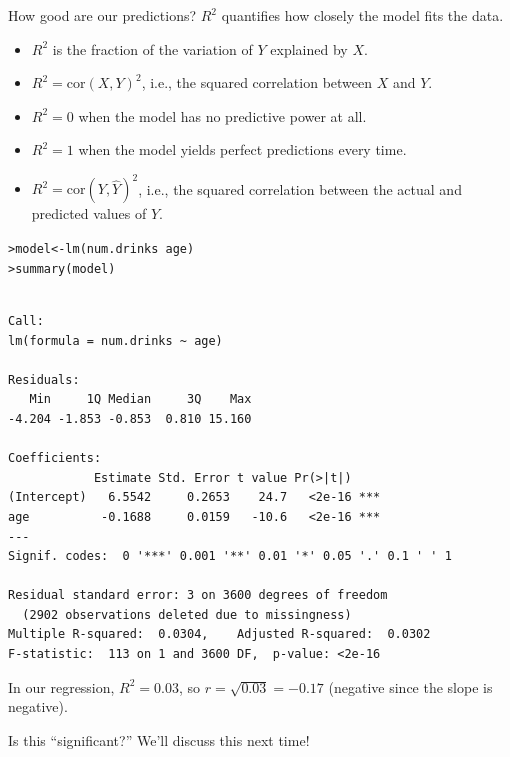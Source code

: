 \documentclass{beamer}\usepackage[]{graphicx}\usepackage[]{color}
\makeatletter
\newcommand{\hlopt}[1]{\textcolor[rgb]{1,0.894,0.769}{#1}}%
\newcommand{\hlstd}[1]{\textcolor[rgb]{1,0.894,0.769}{#1}}%
\newcommand{\hlkwb}[1]{\textcolor[rgb]{0.804,0.776,0.451}{#1}}%
\newcommand{\hlkwd}[1]{\textcolor[rgb]{1,0.78,0.769}{#1}}%
\newenvironment{kframe}{%
 \def\at@end@of@kframe{}%
 \ifinner\ifhmode%
  \def\at@end@of@kframe{\end{minipage}}%
  \begin{minipage}{\columnwidth}%
 \fi\fi%
 \def\FrameCommand##1{\hskip\@totalleftmargin \hskip-\fboxsep
 \colorbox{shadecolor}{##1}\hskip-\fboxsep
     \hskip-\linewidth \hskip-\@totalleftmargin \hskip\columnwidth}%
 \MakeFramed {\advance\hsize-\width
   \@totalleftmargin\z@ \linewidth\hsize
   \@setminipage}}%
 {\par\unskip\endMakeFramed%
 \at@end@of@kframe}
\newenvironment{knitrout}{}{} %
\makeatother
\begin{document}
\begin{darkframes}
    \begin{frame}{How good are our predictions?}
      $R^2$ quantifies how closely the model fits the data.
      \begin{itemize}[<+->]
        \item $R^2$ is the fraction of the variation of $Y$ explained by $X$.
        \item $R^2=\text{cor}(X,Y)^2$, i.e., the squared correlation between $X$ and $Y$.
        \item $R^2=0$ when the model has no predictive power at all.
        \item $R^2=1$ when the model yields perfect predictions every time.
        \item $R^2=\text{cor}(Y,\hat Y)^2$, i.e., the squared correlation between the actual and predicted values of $Y$.
      \end{itemize}
    \end{frame}

    \begin{frame}[fragile]
      \fontsize{9}{9}\selectfont
\begin{knitrout}
\begin{kframe}
\begin{alltt}
\hlstd{> }\hlstd{model} \hlkwb{<-} \hlkwd{lm}\hlstd{(num.drinks} \hlopt{~} \hlstd{age)}
\hlstd{> }\hlkwd{summary}\hlstd{(model)}
\end{alltt}
\begin{verbatim}

Call:
lm(formula = num.drinks ~ age)

Residuals:
   Min     1Q Median     3Q    Max 
-4.204 -1.853 -0.853  0.810 15.160 

Coefficients:
            Estimate Std. Error t value Pr(>|t|)    
(Intercept)   6.5542     0.2653    24.7   <2e-16 ***
age          -0.1688     0.0159   -10.6   <2e-16 ***
---
Signif. codes:  0 '***' 0.001 '**' 0.01 '*' 0.05 '.' 0.1 ' ' 1

Residual standard error: 3 on 3600 degrees of freedom
  (2902 observations deleted due to missingness)
Multiple R-squared:  0.0304,	Adjusted R-squared:  0.0302 
F-statistic:  113 on 1 and 3600 DF,  p-value: <2e-16
\end{verbatim}
\end{kframe}
\end{knitrout}
    \end{frame}

    \begin{frame}
      In our regression, $R^2=0.03$, so $r=\sqrt{0.03}=-0.17$ (negative since the slope is negative).

      Is this ``significant?'' \pause \alert{We'll discuss this next time!}
    \end{frame}
  \end{darkframes}
\end{document}
